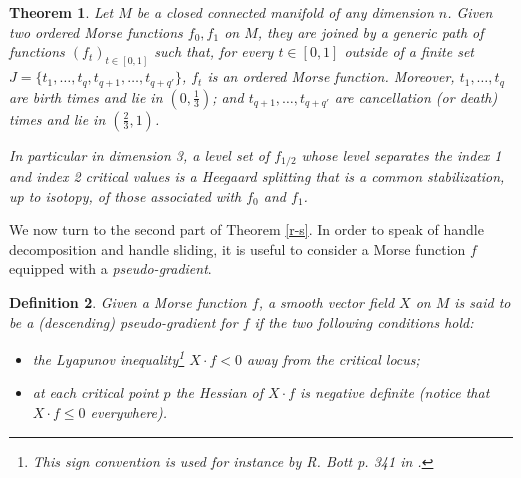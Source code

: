 \documentclass[12pt]{amsart}
\newtheorem{thm}{Theorem}[section]
\newtheorem{defn}[thm]{Definition}
\begin{document}
\begin{thm}\label{order-path} Let $M$ be a closed connected manifold of any dimension $n$. %
Given two ordered Morse functions $f_0,f_1$ on $M$, they are joined %
by a generic path of functions 
$\left( f_t\right)_{t\in[0,1]}$ 
such that, for every $t\in[0,1]$ %
outside of   a finite set $J=\{t_1,\ldots, t_q, t_{q+1},\ldots, t_{q+q'}\}$, %
$f_t$ is an ordered Morse function. Moreover, $t_1, \ldots, t_q$ are 
birth times and lie in $\left(0,  \frac13\right)$;  and  $t_{q+1},\ldots, t_{q+q'}$
are cancellation (or death) times and lie in $\left(\frac 23, 1\right)$. 

In particular in dimension 3,  a level set of $f_{1/2}$ whose level separates
the  index 1 and index 2 critical values is a Heegaard splitting that is a common
stabilization, up to isotopy, of those associated with $f_0$ and $f_1$. \\
\end{thm}


We now turn to the second part of Theorem \ref{r-s}.
In order to speak of handle decomposition and handle sliding,  it is useful to 
consider a Morse function $f$ equipped with a {\it pseudo-gradient}. 

\begin{defn} \label{pseudo} Given a Morse function $f$,  a smooth vector field $X$ on $M$ is said to be a (descending)
pseudo-gradient for $f$ if the two following conditions hold:
\begin{itemize}
\item the Lyapunov inequality\footnote{This sign convention   is used for instance by R. Bott p. 341 in \cite{bott}. } $X\cdot f<0$ away from the critical locus;
\item  at each
critical point $p$ the Hessian %
of $X\cdot f$ is negative definite (notice that $X\cdot f\leq 0$
everywhere). 
\end{itemize}
\end{defn}
\end{document}
